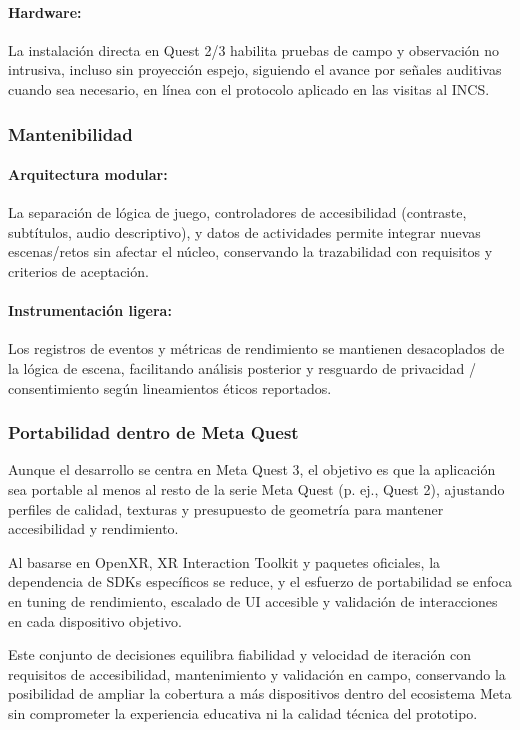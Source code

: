 \paragraph{Hardware:}
La instalación directa en Quest 2/3 habilita pruebas de campo y observación no intrusiva, incluso sin proyección espejo, siguiendo el avance por señales auditivas cuando sea necesario, en línea con el protocolo aplicado en las visitas al INCS.

\subsubsection{Mantenibilidad}

\paragraph{Arquitectura modular:}
La separación de lógica de juego, controladores de accesibilidad (contraste, subtítulos, audio descriptivo), y datos de actividades permite integrar nuevas escenas/retos sin afectar el núcleo, conservando la trazabilidad con requisitos y criterios de aceptación.

\paragraph{Instrumentación ligera:}
Los registros de eventos y métricas de rendimiento se mantienen desacoplados de la lógica de escena, facilitando análisis posterior y resguardo de privacidad / consentimiento según lineamientos éticos reportados.

\subsubsection{Portabilidad dentro de Meta Quest}

Aunque el desarrollo se centra en Meta Quest 3, el objetivo es que la aplicación sea portable al menos al resto de la serie Meta Quest (p. ej., Quest 2), ajustando perfiles de calidad, texturas y presupuesto de geometría para mantener accesibilidad y rendimiento.

Al basarse en OpenXR, XR Interaction Toolkit y paquetes oficiales, la dependencia de SDKs específicos se reduce, y el esfuerzo de portabilidad se enfoca en tuning de rendimiento, escalado de UI accesible y validación de interacciones en cada dispositivo objetivo.

Este conjunto de decisiones equilibra fiabilidad y velocidad de iteración con requisitos de accesibilidad, mantenimiento y validación en campo, conservando la posibilidad de ampliar la cobertura a más dispositivos dentro del ecosistema Meta sin comprometer la experiencia educativa ni la calidad técnica del prototipo.

